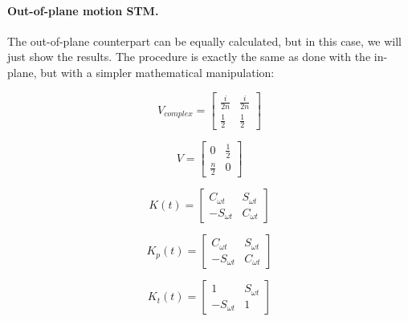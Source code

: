		\paragraph{ Out-of-plane motion STM.}
		\indent The out-of-plane counterpart can be equally calculated, but in this case, we will just show the results. The procedure is exactly the same as done with the in-plane, but with a simpler mathematical manipulation:
		\begin{minipage}{0.5\linewidth}
			\begin{equation}
			V_{complex} = \left[ \begin{array}{cc}
			\frac{i}{2n} 	& \frac{i}{2n}		\\
			\frac{1}{2} 	& \frac{1}{2}	  
			\end{array}\right]
			\label{eqCh2:V_comp_OOP}
		  	\end{equation}
		\end{minipage}
		\begin{minipage}{0.5\linewidth}
			\begin{equation}
			V = \left[ \begin{array}{cc}
			0 				& \frac{1}{2}		\\
			\frac{n}{2} 	& 	0  
			\end{array}\right]
			\label{eqCh2:V_real_OOP}
		  	\end{equation}
		\end{minipage}		
		\begin{minipage}{0.3\linewidth}
			\begin{equation}
			K(t) = \left[ \begin{array}{cc}
			C_{\omega t}		& S_{\omega t}	\\
			 - S_{\omega t}	& C_{\omega t}
			\end{array}\right]
			\label{eqCh2:K_OOP}
		  	\end{equation}
	  	\end{minipage}
	  	\begin{minipage}{0.3\linewidth}
			\begin{equation}
			K_p(t) = \left[ \begin{array}{cc}
			C_{\omega t}		& S_{\omega t}	\\
			 - S_{\omega t}	& C_{\omega t}
			\end{array}\right]
			\label{eqCh2:Kp_OOP}
		  	\end{equation}
	  	\end{minipage}
		\begin{minipage}{0.3\linewidth}
			\begin{equation}
			K_t(t) = \left[ \begin{array}{cc}
			1	& S_{\omega t}	\\
			 - S_{\omega t}	& 1
			\end{array}\right]
			\label{eqCh2:Kt_OOP}
		  	\end{equation}
	  	\end{minipage}\\
